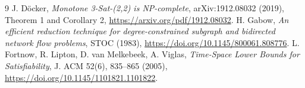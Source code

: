 \documentclass[11pt]{article}
\begin{document}
\begin{thebibliography}{9}
 J. D\"ocker, \emph{Monotone 3-Sat-(2,2) is NP-complete}, arXiv:1912.08032 (2019), Theorem 1 and Corollary 2, \url{https://arxiv.org/pdf/1912.08032}.
 H. Gabow, \emph{An efficient reduction technique for degree-constrained subgraph and bidirected network flow problems}, STOC (1983), \url{https://doi.org/10.1145/800061.808776}.
 L. Fortnow, R. Lipton, D. van Melkebeek, A. Viglas, \emph{Time-Space Lower Bounds for Satisfiability}, J. ACM 52(6), 835--865 (2005), \url{https://doi.org/10.1145/1101821.1101822}.
\end{thebibliography}
\end{document}
